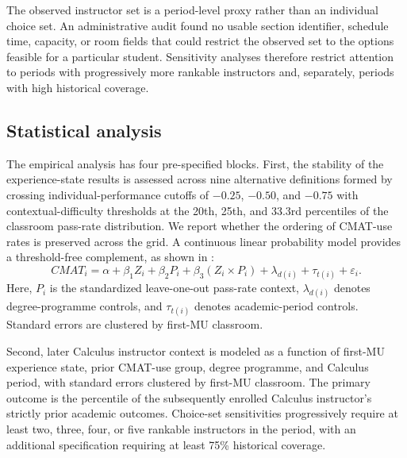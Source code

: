 The observed instructor set is a period-level proxy rather than an individual choice set. An administrative audit found no usable section identifier, schedule time, capacity, or room fields that could restrict the observed set to the options feasible for a particular student. Sensitivity analyses therefore restrict attention to periods with progressively more rankable instructors and, separately, periods with high historical coverage.


\subsection{Statistical analysis}

The empirical analysis has four pre-specified blocks. First, the stability of the experience-state results is assessed across nine alternative definitions formed by crossing individual-performance cutoffs of $-0.25$, $-0.50$, and $-0.75$ with contextual-difficulty thresholds at the 20th, 25th, and 33.3rd percentiles of the classroom pass-rate distribution. We report whether the ordering of CMAT-use rates is preserved across the grid. A continuous linear probability model provides a threshold-free complement, as shown in :
\begin{equation}
CMAT_i = \alpha + \beta_1 Z_i + \beta_2 P_i
+ \beta_3(Z_i\times P_i)+\lambda_{d(i)}+\tau_{t(i)}+\varepsilon_i.
\label{eq:cmat-lpm}
\end{equation}
Here, $P_i$ is the standardized leave-one-out pass-rate context, $\lambda_{d(i)}$ denotes degree-programme controls, and $\tau_{t(i)}$ denotes academic-period controls. Standard errors are clustered by first-MU classroom.

Second, later Calculus instructor context is modeled as a function of first-MU experience state, prior CMAT-use group, degree programme, and Calculus period, with standard errors clustered by first-MU classroom. The primary outcome is the percentile of the subsequently enrolled Calculus instructor's strictly prior academic outcomes. Choice-set sensitivities progressively require at least two, three, four, or five rankable instructors in the period, with an additional specification requiring at least 75\% historical coverage.

